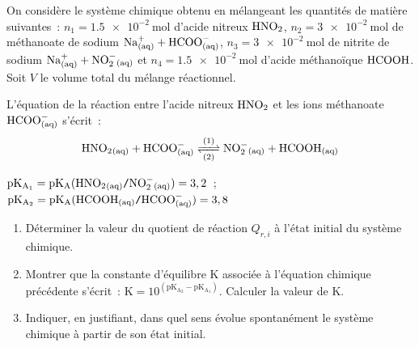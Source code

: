 On considère le système chimique obtenu en mélangeant les quantités de matière
suivantes~: ${n_{1}=\qty{1.5e-2}{\mol}}$ d'acide nitreux $\ce{HNO2}$,
$n_{2}=\qty{3e-2}{\mol}$ de méthanoate de sodium $\ce{Na^+_{(aq)} +
HCOO^-_{(aq)}}$, $n_{3}=\qty{3e-2}{\mol}$ de nitrite de sodium $\ce{Na^+_{(aq)}
+ NO^-_2_{(aq)}}$ et $n_{4}=\qty{1.5e-2}{\mol}$ d'acide méthanoïque
$\ce{HCOOH}$. Soit $V$ le volume total du mélange réactionnel.

L'équation de la réaction entre l'acide nitreux $\ce{HNO2}$ et les ions
méthanoate $\ce{HCOO^-_{(aq)}}$ s'écrit~:
\[
    \ce{HNO2_{(aq)} + HCOO^-_{(aq)} <=>[(1)][(2)] NO^-_2_{(aq)} + HCOOH_{(aq)}}
\]

\begin{donnees}
    $\mathrm{pK_{A_{1}}}=
    \mathrm{pK_{A}}(\ce{HNO2_{(aq)}}\ttslash{}\ce{NO^-_2_{(aq)}})=3,2$~; \quad
    $\mathrm{pK_{A_2}}=
    \mathrm{pK_{A}}(\ce{HCOOH_{(aq)}}\ttslash{}\ce{HCOO^-_{(aq)}})=3,8$
\end{donnees}

\begin{enumerate}
    \item Déterminer la valeur du quotient de réaction $Q_{r,i}$ à l'état
          initial du système chimique.
    \item Montrer que la constante d'équilibre $\mathrm{K}$ associée à
          l'équation chimique précédente s'écrit~:
          ${\mathrm{K}=10^{(\mathrm{pK_{A_2}-pK_{A_1}})}}$.
          Calculer la valeur de $\mathrm{K}$.
    \item Indiquer, en justifiant, dans quel sens évolue spontanément le système
          chimique à partir de son état initial.
\end{enumerate}



